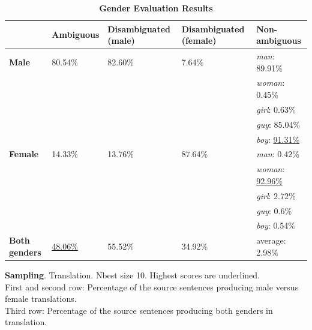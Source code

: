 \begin{table}[!htb]
    \ContinuedFloat 
    \begin{subtable}{\textwidth}
        \centering
        \begin{tabularx}{\linewidth}{|X|XXXX|}
            \hline
             & \textbf{Ambiguous} & \textbf{Disambiguated (male)} & \textbf{Disambiguated (female)} & \textbf{Non-ambiguous} \\ \hline
             \textbf{Male} & 80.54\% & 82.60\% & 7.64\% & \textit{man}: 89.91\% \\
             &&&& \textit{woman}: 0.45\% \\
             &&&& \textit{girl}: 0.63\% \\
             &&&& \textit{guy}: 85.04\% \\
             &&&& \textit{boy}: \underline{91.31\%} \\ \hline
             \textbf{Female} & 14.33\% & 13.76\% & 87.64\% & \textit{man}: 0.42\% \\ 
             &&&& \textit{woman}: \underline{92.96\%} \\
             &&&& \textit{girl}: 2.72\% \\
             &&&& \textit{guy}: 0.6\% \\
             &&&& \textit{boy}: 0.54\% \\\hline
             \textbf{Both genders} & \underline{48.06\%} & 55.52\% & 34.92\% & average: 2.98\% \\ \hline
        \end{tabularx}

        \caption{\textbf{Sampling}. Translation. Nbest size 10. Highest scores are underlined. \\ First and second row: Percentage of the source sentences producing male versus female translations. \\ Third row: Percentage of the source sentences producing both genders in translation.}
        \label{tab:gender_percent_sampling}
    \end{subtable}
    
    \caption{\textbf{Gender Evaluation Results}}
    \label{tab:gender_percent}
\end{table}

